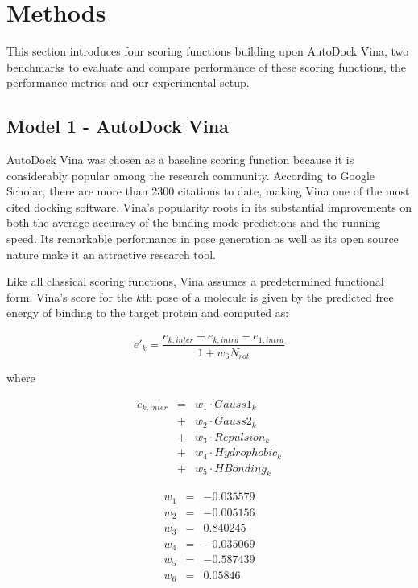 \documentclass[twocolumn]{bmcart}
\begin{document}
\section*{Methods}

This section introduces four scoring functions building upon AutoDock Vina, two benchmarks to evaluate and compare performance of these scoring functions, the performance metrics and our experimental setup.

\subsection*{Model 1 - AutoDock Vina}

AutoDock Vina \cite{595} was chosen as a baseline scoring function because it is considerably popular among the research community. According to Google Scholar, there are more than 2300 citations to date, making Vina one of the most cited docking software. Vina's popularity roots in its substantial improvements on both the average accuracy of the binding mode predictions and the running speed. Its remarkable performance in pose generation as well as its open source nature make it an attractive research tool.

Like all classical scoring functions, Vina assumes a predetermined functional form. Vina's score for the $k$th pose of a molecule is given by the predicted free energy of binding to the target protein and computed as:

\begin{equation}
\label{rfscore4:e_k}
e'_k=\frac{e_{k,inter}+e_{k,intra}-e_{1,intra}}{1+w_6N_{rot}}
\end{equation}

where

\begin{eqnarray}
\label{rfscore4:e_k_inter}
e_{k,inter} &=& w_1 \cdot Gauss1_k \nonumber \\
            &+& w_2 \cdot Gauss2_k \nonumber \\
		    &+& w_3 \cdot Repulsion_k \nonumber \\
		    &+& w_4 \cdot Hydrophobic_k \nonumber \\
		    &+& w_5 \cdot HBonding_k
\end{eqnarray}

\begin{eqnarray}
\label{rfscore4:w}
w_1 &=& -0.035579 \nonumber \\
w_2 &=& -0.005156 \nonumber \\
w_3 &=&  0.840245 \nonumber \\
w_4 &=& -0.035069 \nonumber \\
w_5 &=& -0.587439 \nonumber \\
w_6 &=&  0.05846
\end{eqnarray}
\end{document}
